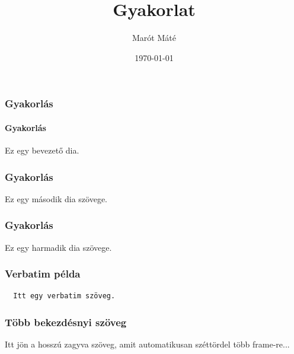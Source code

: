\documentclass[12pt,aspectratio=169]{beamer}
\title{Gyakorlat}
\author{Marót Máté}
\date{\today}
\begin{document}
\begin{frame}
  \titlepage
\end{frame}

\begin{frame}
  \frametitle{Gyakorlás}
  \framesubtitle{Gyakorlás}
  Ez egy bevezető dia.
\end{frame}

\begin{frame}
  \frametitle{Gyakorlás}
  Ez egy második dia szövege.
\end{frame}

\begin{frame}
  \frametitle{Gyakorlás}
  Ez egy harmadik dia szövege.
\end{frame}

\begin{frame}[fragile]
  \frametitle{Verbatim példa}
  \begin{verbatim}
  Itt egy verbatim szöveg.
  \end{verbatim}
\end{frame}

\begin{frame}[allowframebreaks]
  \frametitle{Több bekezdésnyi szöveg}
  Itt jön a hosszú zagyva szöveg, amit automatikusan széttördel több frame-re...
\end{frame}
\end{document}
